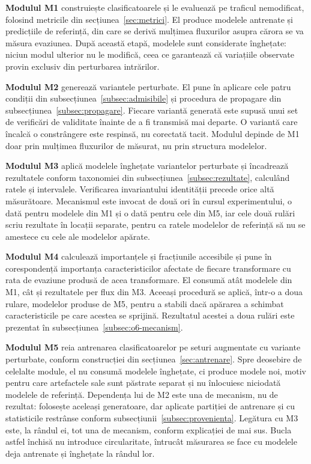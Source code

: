 \textbf{Modulul M1} construiește clasificatoarele și le evaluează pe traficul nemodificat, folosind metricile din secțiunea~\ref{sec:metrici}. El produce modelele antrenate și predicțiile de referință, din care se derivă mulțimea fluxurilor asupra cărora se va măsura evaziunea. După această etapă, modelele sunt considerate înghețate: niciun modul ulterior nu le modifică, ceea ce garantează că variațiile observate provin exclusiv din perturbarea intrărilor.

\textbf{Modulul M2} generează variantele perturbate. El pune în aplicare cele patru condiții din subsecțiunea~\ref{subsec:admisibile} și procedura de propagare din subsecțiunea~\ref{subsec:propagare}. Fiecare variantă generată este supusă unui set de verificări de validitate înainte de a fi transmisă mai departe. O variantă care încalcă o constrângere este respinsă, nu corectată tacit. Modulul depinde de M1 doar prin mulțimea fluxurilor de măsurat, nu prin structura modelelor.

\textbf{Modulul M3} aplică modelele înghețate variantelor perturbate și încadrează rezultatele conform taxonomiei din subsecțiunea~\ref{subsec:rezultate}, calculând ratele și intervalele. Verificarea invariantului identității precede orice altă măsurătoare. Mecanismul este invocat de două ori în cursul experimentului, o dată pentru modelele din M1 și o dată pentru cele din M5, iar cele două rulări scriu rezultate în locații separate, pentru ca ratele modelelor de referință să nu se amestece cu cele ale modelelor apărate.

\textbf{Modulul M4} calculează importanțele și fracțiunile accesibile și pune în coresponden\-ță importanța caracteristicilor afectate de fiecare transformare cu rata de evaziune produsă de acea transformare. El consumă atât modelele din M1, cât și rezultatele per flux din M3. Aceeași procedură se aplică, într-o a doua rulare, modelelor produse de M5, pentru a stabili dacă apărarea a schimbat caracteristicile pe care acestea se sprijină. Rezultatul acestei a doua rulări este prezentat în subsecțiunea~\ref{subsec:o6-mecanism}.

\textbf{Modulul M5} reia antrenarea clasificatoarelor pe seturi augmentate cu variante perturbate, conform construcției din secțiunea~\ref{sec:antrenare}. Spre deosebire de celelalte module, el nu consumă modelele înghețate, ci produce modele noi, motiv pentru care artefactele sale sunt păstrate separat și nu înlocuiesc niciodată modelele de referință. Dependența lui de M2 este una de mecanism, nu de rezultat: folosește aceleași generatoare, dar aplicate partiției de antrenare și cu statisticile restrânse conform subsecțiunii~\ref{subsec:provenienta}. Legătura cu M3 este, la rândul ei, tot una de mecanism, conform explicației de mai sus. Bucla astfel închisă nu introduce circularitate, întrucât măsurarea se face cu modelele deja antrenate și înghețate la rândul lor.

